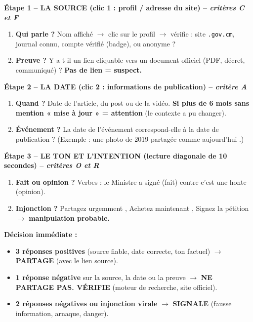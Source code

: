 \documentclass[11pt]{article}
\begin{document}
\begin{methode}
\textbf{Étape 1 -- LA SOURCE (clic 1 : profil / adresse du site) -- \emph{critères C et F}}
\begin{enumerate}
    \item \textbf{Qui parle ?} Nom affiché $\to$ clic sur le profil $\to$ vérifie : site \texttt{.gov.cm}, journal connu, compte vérifié (badge), ou anonyme ?
    \item \textbf{Preuve ?} Y a-t-il un lien cliquable vers un document officiel (PDF, décret, communiqué) ? \textbf{Pas de lien = suspect.}
\end{enumerate}

\textbf{Étape 2 -- LA DATE (clic 2 : informations de publication) -- \emph{critère A}}
\begin{enumerate}
    \item \textbf{Quand ?} Date de l'article, du post ou de la vidéo. \textbf{Si plus de 6 mois sans mention « mise à jour » = attention} (le contexte a pu changer).
    \item \textbf{Événement ?} La date de l'événement correspond-elle à la date de publication ? (Exemple : une photo de 2019 partagée comme \og{} aujourd'hui \fg{}.)
\end{enumerate}

\textbf{Étape 3 -- LE TON ET L'INTENTION (lecture diagonale de 10 secondes) -- \emph{critères O et R}}
\begin{enumerate}
    \item \textbf{Fait ou opinion ?} Verbes : \og{} le Ministre a signé \fg{} (fait) contre \og{} c'est une honte \fg{} (opinion).
    \item \textbf{Injonction ?} \og{} Partagez urgemment \fg{}, \og{} Achetez maintenant \fg{}, \og{} Signez la pétition \fg{} $\to$ \textbf{manipulation probable.}
\end{enumerate}

\textbf{Décision immédiate :}
\begin{itemize}
    \item \textbf{3 réponses positives} (source fiable, date correcte, ton factuel) $\to$ \textbf{PARTAGE} (avec le lien source).
    \item \textbf{1 réponse négative} sur la source, la date ou la preuve $\to$ \textbf{NE PARTAGE PAS. VÉRIFIE} (moteur de recherche, site officiel).
    \item \textbf{2 réponses négatives ou injonction virale} $\to$ \textbf{SIGNALE} (fausse information, arnaque, danger).
\end{itemize}
\end{methode}
\end{document}
